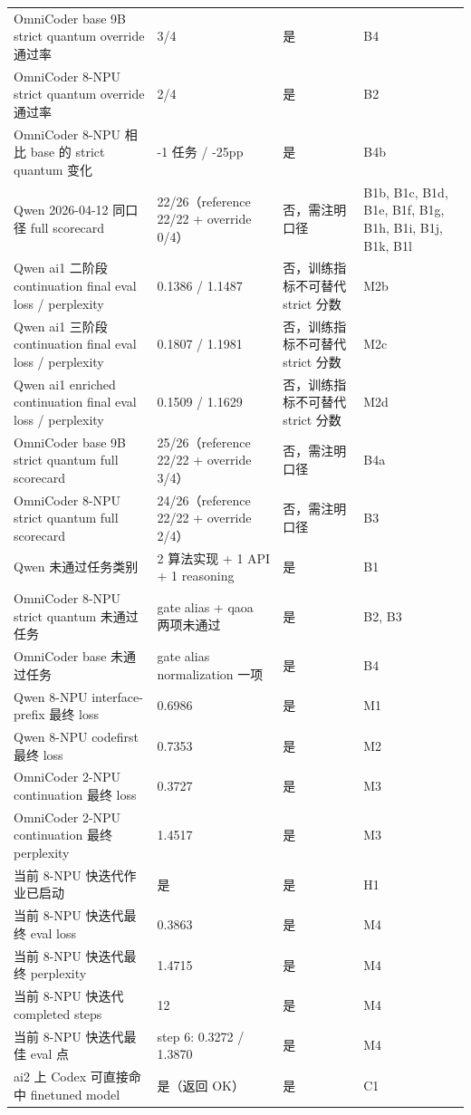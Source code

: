 \documentclass[11pt,a4paper]{article}
\begin{document}
\begin{longtable}{p{3.8cm} p{2.2cm} p{1.4cm} p{4.8cm}}
OmniCoder base 9B strict quantum override 通过率 & 3/4 & 是 & B4 \\
OmniCoder 8-NPU strict quantum override 通过率 & 2/4 & 是 & B2 \\
OmniCoder 8-NPU 相比 base 的 strict quantum 变化 & -1 任务 / -25pp & 是 & B4b \\
Qwen 2026-04-12 同口径 full scorecard & 22/26（reference 22/22 + override 0/4） & 否，需注明口径 & B1b, B1c, B1d, B1e, B1f, B1g, B1h, B1i, B1j, B1k, B1l \\
Qwen ai1 二阶段 continuation final eval loss / perplexity & 0.1386 / 1.1487 & 否，训练指标不可替代 strict 分数 & M2b \\
Qwen ai1 三阶段 continuation final eval loss / perplexity & 0.1807 / 1.1981 & 否，训练指标不可替代 strict 分数 & M2c \\
Qwen ai1 enriched continuation final eval loss / perplexity & 0.1509 / 1.1629 & 否，训练指标不可替代 strict 分数 & M2d \\
OmniCoder base 9B strict quantum full scorecard & 25/26（reference 22/22 + override 3/4） & 否，需注明口径 & B4a \\
OmniCoder 8-NPU strict quantum full scorecard & 24/26（reference 22/22 + override 2/4） & 否，需注明口径 & B3 \\
Qwen 未通过任务类别 & 2 算法实现 + 1 API + 1 reasoning & 是 & B1 \\
OmniCoder 8-NPU strict quantum 未通过任务 & gate alias + qaoa 两项未通过 & 是 & B2, B3 \\
OmniCoder base 未通过任务 & gate alias normalization 一项 & 是 & B4 \\
Qwen 8-NPU interface-prefix 最终 loss & 0.6986 & 是 & M1 \\
Qwen 8-NPU codefirst 最终 loss & 0.7353 & 是 & M2 \\
OmniCoder 2-NPU continuation 最终 loss & 0.3727 & 是 & M3 \\
OmniCoder 2-NPU continuation 最终 perplexity & 1.4517 & 是 & M3 \\
当前 8-NPU 快迭代作业已启动 & 是 & 是 & H1 \\
当前 8-NPU 快迭代最终 eval loss & 0.3863 & 是 & M4 \\
当前 8-NPU 快迭代最终 perplexity & 1.4715 & 是 & M4 \\
当前 8-NPU 快迭代 completed steps & 12 & 是 & M4 \\
当前 8-NPU 快迭代最佳 eval 点 & step 6: 0.3272 / 1.3870 & 是 & M4 \\
ai2 上 Codex 可直接命中 finetuned model & 是（返回 OK） & 是 & C1 \\

\end{longtable}
\end{document}
